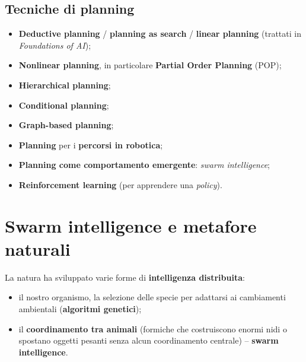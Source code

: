 
\subsection{Tecniche di planning}

\begin{itemize}
  \item \textbf{Deductive planning} / \textbf{planning as search} / \textbf{linear
    planning} (trattati in \emph{Foundations of AI});
  \item \textbf{Nonlinear planning}, in particolare \textbf{Partial Order Planning}
    (POP);
  \item \textbf{Hierarchical planning};
  \item \textbf{Conditional planning};
  \item \textbf{Graph-based planning};
  \item \textbf{Planning} per i \textbf{percorsi in robotica};
  \item \textbf{Planning come comportamento emergente}: \emph{swarm intelligence};
  \item \textbf{Reinforcement learning} (per apprendere una \emph{policy}).
\end{itemize}

\section{Swarm intelligence e metafore naturali}

La natura ha sviluppato varie forme di \textbf{intelligenza distribuita}:
\begin{itemize}
  \item il nostro organismo, la selezione delle specie per adattarsi ai cambiamenti
    ambientali (\textbf{algoritmi genetici});
  \item il \textbf{coordinamento tra animali} (formiche che costruiscono enormi nidi
    o spostano oggetti pesanti senza alcun coordinamento centrale)
    -- \textbf{swarm intelligence}.
\end{itemize}


